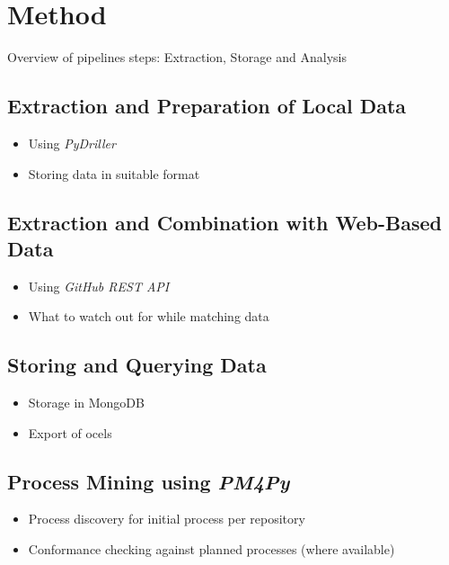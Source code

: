 \chapter{Method}
\label{chap:method}
Overview of pipelines steps: Extraction, Storage and Analysis

\section{Extraction and Preparation of Local Data}
\begin{itemize}
	\item Using \emph{PyDriller}
	\item Storing data in suitable format 
\end{itemize}

\section{Extraction and Combination with Web-Based Data}
\begin{itemize}
	\item Using \emph{GitHub REST API}
	\item What to watch out for while matching data
\end{itemize}

\section{Storing and Querying Data}
\begin{itemize}
	\item Storage in MongoDB
	\item Export of \acp{ocel}
\end{itemize}

\section{Process Mining using \emph{PM4Py}}
\begin{itemize}
	\item Process discovery for initial process per repository
	\item Conformance checking against planned processes (where available)
\end{itemize}